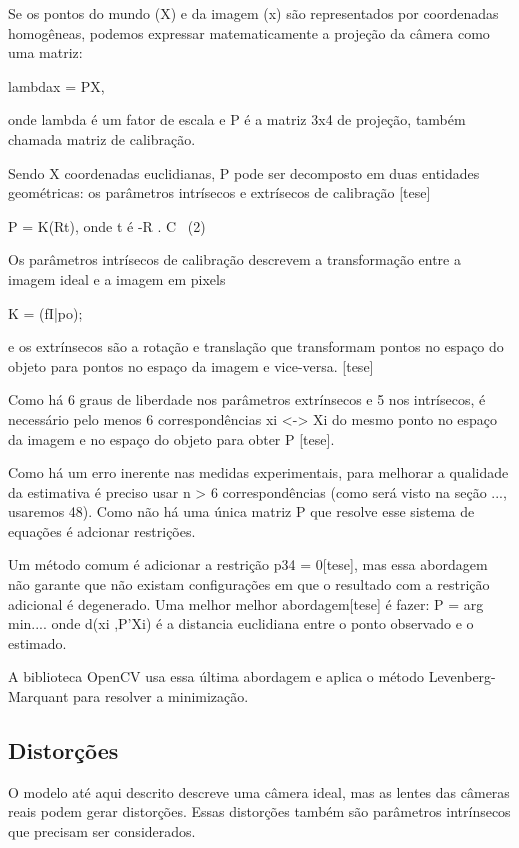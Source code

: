 \documentclass[conference]{IEEEtran}
\begin{document}
Se os pontos do mundo (X) e da imagem (x) são representados por coordenadas homogêneas, podemos expressar matematicamente a projeção da câmera como uma matriz\cite{tese}:

lambdax = PX,

onde lambda é um fator de escala e P é a matriz 3x4 de projeção, também chamada matriz de calibração.

Sendo X coordenadas euclidianas, P pode ser decomposto em duas entidades geométricas: os parâmetros intrísecos e extrísecos de calibração [tese]

P = K(Rt), onde t é -R . C~ (2) \cite{Hartley2004}

Os parâmetros intrísecos de calibração descrevem a transformação entre a imagem ideal e a imagem em pixels

K = (fI|po);

e os extrínsecos são a rotação e translação que transformam pontos no espaço do objeto para pontos no espaço da imagem e vice-versa. [tese]

Como há 6 graus de liberdade nos parâmetros extrínsecos e 5 nos intrísecos, é necessário pelo menos 6 correspondências {xi <-> Xi} do mesmo ponto no espaço da imagem e no espaço do objeto para obter P [tese]. 

Como há um erro inerente nas medidas experimentais, para melhorar a qualidade da estimativa é preciso usar n > 6 correspondências (como será visto na seção ..., usaremos 48). Como não há uma única matriz P que resolve esse sistema de equações é adcionar restrições.  

Um método comum é adicionar a restrição p34 = 0\cite{Hartley2004}[tese], mas essa abordagem não garante que não existam configurações em que o resultado com a restrição adicional é degenerado. Uma melhor melhor abordagem[tese] é fazer:
P = arg min....
onde d(xi ,P'Xi) é a distancia euclidiana entre o ponto observado e o estimado.

A biblioteca OpenCV usa essa última abordagem e aplica o método Levenberg-Marquant para resolver a minimização. 

\subsection{Distorções}

O modelo até aqui descrito descreve uma câmera ideal, mas as lentes das câmeras reais podem gerar distorções.  Essas distorções também são parâmetros intrínsecos que precisam ser considerados. 
\end{document}
